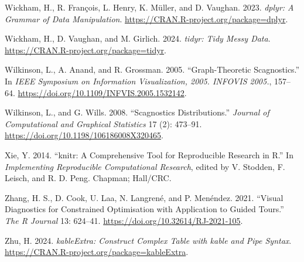 \documentclass[
  12pt,
]{interact}
\newlength{\cslhangindent}
\newenvironment{CSLReferences}[2] %
 {\begin{list}{}{%
  \setlength{\itemindent}{0pt}
  \setlength{\leftmargin}{0pt}
  \setlength{\parsep}{0pt}
  \ifodd #1
   \setlength{\leftmargin}{\cslhangindent}
   \setlength{\itemindent}{-1\cslhangindent}
  \fi
  \setlength{\itemsep}{#2\baselineskip}}}
 {\end{list}}
\theoremstyle{plain}
\begin{document}
\begin{CSLReferences}{1}{0}
Wickham, H., R. François, L. Henry, K. Müller, and D. Vaughan. 2023.
\emph{{d}plyr: A Grammar of Data Manipulation}.
\url{https://CRAN.R-project.org/package=dplyr}.

Wickham, H., D. Vaughan, and M. Girlich. 2024. \emph{{t}idyr: Tidy Messy
Data}. \url{https://CRAN.R-project.org/package=tidyr}.

Wilkinson, L., A. Anand, and R. Grossman. 2005. {``Graph-Theoretic
Scagnostics.''} In \emph{IEEE Symposium on Information Visualization,
2005. INFOVIS 2005.}, 157--64.
\url{https://doi.org/10.1109/INFVIS.2005.1532142}.

Wilkinson, L., and G. Wills. 2008. {``Scagnostics Distributions.''}
\emph{Journal of Computational and Graphical Statistics} 17 (2):
473--91. \url{https://doi.org/10.1198/106186008X320465}.

Xie, Y. 2014. {``{k}nitr: A Comprehensive Tool for Reproducible Research
in {R}.''} In \emph{Implementing Reproducible Computational Research},
edited by V. Stodden, F. Leisch, and R. D. Peng. Chapman; Hall/CRC.

Zhang, H. S., D. Cook, U. Laa, N. Langrené, and P. Menéndez. 2021.
{``Visual Diagnostics for Constrained Optimisation with Application to
Guided Tours.''} \emph{The R Journal} 13: 624--41.
\url{https://doi.org/10.32614/RJ-2021-105}.

Zhu, H. 2024. \emph{{k}ableExtra: Construct Complex Table with {kable}
and Pipe Syntax}. \url{https://CRAN.R-project.org/package=kableExtra}.

\end{CSLReferences}
\end{document}

